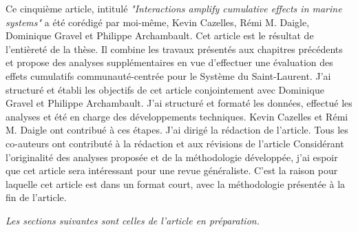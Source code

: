 Ce cinquième article, intitulé \textit{"Interactions amplify cumulative effects in marine systems"} a été corédigé par moi-même, Kevin Cazelles, Rémi M. Daigle, Dominique Gravel et Philippe Archambault. Cet article est le résultat de l'entièreté de la thèse. Il combine les travaux présentés aux chapitres précédents et propose des analyses supplémentaires en vue d'effectuer une évaluation des effets cumulatifs communauté-centrée pour le Système du Saint-Laurent. J'ai structuré et établi les objectifs de cet article conjointement avec Dominique Gravel et Philippe Archambault. J'ai structuré et formaté les données, effectué les analyses et été en charge des développements techniques. Kevin Cazelles et Rémi M. Daigle ont contribué à ces étapes. J'ai dirigé la rédaction de l'article. Tous les co-auteurs ont contributé à la rédaction et aux révisions de l'article Considérant l'originalité des analyses proposée et de la méthodologie développée, j'ai espoir que cet article sera intéressant pour une revue généraliste. C'est la raison pour laquelle cet article est dans un format court, avec la méthodologie présentée à la fin de l'article. \linebreak[4]


\textit{Les sections suivantes sont celles de l'article en préparation.}
